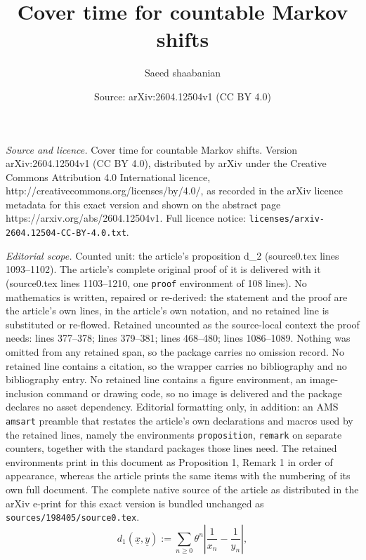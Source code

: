 \documentclass[10pt,a4paper]{amsart}
\title{Cover time for countable Markov shifts}
\author{Saeed shaabanian}
\date{Source: arXiv:2604.12504v1 (CC BY 4.0)}
\def\ulx{\underline{x}}
\begin{document}
\maketitle

\noindent\emph{Source and licence.} Cover time for countable Markov shifts. Version arXiv:2604.12504v1 (CC BY 4.0), distributed by arXiv under the Creative Commons Attribution 4.0 International licence, http://creativecommons.org/licenses/by/4.0/, as recorded in the arXiv licence metadata for this exact version and shown on the abstract page https://arxiv.org/abs/2604.12504v1. Full licence notice: \texttt{licenses/arxiv-2604.12504-CC-BY-4.0.txt}.\par\smallskip

\noindent\textit{Editorial scope.} Counted unit: the article's proposition d\_2 (source0.tex lines 1093--1102). The article's complete original proof of it is delivered with it (source0.tex lines 1103--1210, one \texttt{proof} environment of 108 lines). No mathematics is written, repaired or re-derived: the statement and the proof are the article's own lines, in the article's own notation, and no retained line is substituted or re-flowed.  Retained uncounted as the source-local context the proof needs: lines 377--378; lines 379--381; lines 468--480; lines 1086--1089.  Nothing was omitted from any retained span, so the package carries no omission record.  No retained line contains a citation, so the wrapper carries no bibliography and no bibliography entry.  No retained line contains a figure environment, an image-inclusion command or drawing code, so no image is delivered and the package declares no asset dependency.  Editorial formatting only, in addition: an AMS \texttt{amsart} preamble that restates the article's own declarations and macros used by the retained lines, namely the environments \texttt{proposition}, \texttt{remark} on separate counters, together with the standard packages those lines need.  The retained environments print in this document as Proposition 1, Remark 1 in order of appearance, whereas the article prints the same items with the numbering of its own full document.  The complete native source of the article as distributed in the arXiv e-print for this exact version is bundled unchanged as \texttt{sources/198405/source0.tex}.
\begin{equation}\label{Def:Metric d}
d_1(\ulx,\underline{y}):=\sum_{n\ge 0} \theta^n \left| \frac{1}{x_n} - \frac{1}{y_n} \right|,\end{equation}
\end{document}
